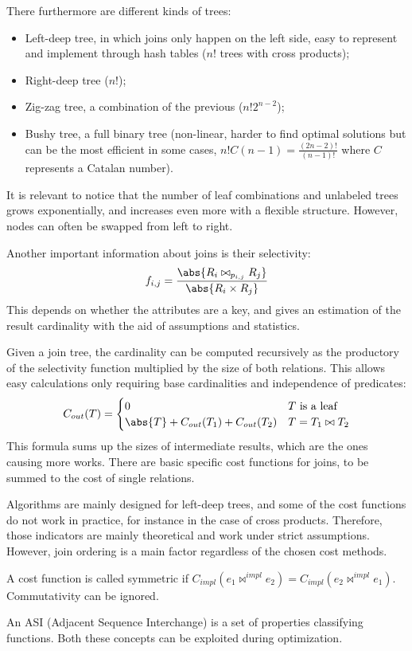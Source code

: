 There furthermore are different kinds of trees:
\begin{itemize}
	\item Left-deep tree, in which joins only happen on the left side, easy to represent and implement through hash tables ($n!$ trees with cross products);
	\item Right-deep tree ($n!$);
	\item Zig-zag tree, a combination of the previous ($n!2^{n-2}$);
	\item Bushy tree, a full binary tree (non-linear, harder to find optimal solutions but can be the most efficient in some cases, $n!C(n-1) = \frac{(2n-2)!}{(n-1)!}$ where $C$ represents a Catalan number).
\end{itemize}
It is relevant to notice that the number of leaf combinations and unlabeled trees grows exponentially, and increases even more with a flexible structure. However, nodes can often be swapped from left to right.

Another important information about joins is their selectivity: 
$$f_{i, j} = \frac{\abs{R_i \bowtie_{p_{i, j}} R_j}}{\abs{R_i \times R_j}}$$
This depends on whether the attributes are a key, and gives an estimation of the result cardinality with the aid of assumptions and statistics.

Given a join tree, the cardinality can be computed recursively as the productory of the selectivity function multiplied by the size of both relations. This allows easy calculations only requiring base cardinalities and independence of predicates:
$$C_{out}(T) = \begin{cases}
0 & T\text{ is a leaf} \\
\abs{T} + C_{out}(T_1) + C_{out}(T_2) & T = T_1 \bowtie T_2
\end{cases}$$
This formula sums up the sizes of intermediate results, which are the ones causing more works. There are basic specific cost functions for joins, to be summed to the cost of single relations. 

Algorithms are mainly designed for left-deep trees, and some of the cost functions do not work in practice, for instance in the case of cross products. Therefore, those indicators are mainly theoretical and work under strict assumptions. However, join ordering is a main factor regardless of the chosen cost methods.

A cost function is called symmetric if $C_{impl}(e_1 \bowtie^{impl} e_2) = C_{impl}(e_2 \bowtie^{impl} e_1)$. Commutativity can be ignored.

An ASI (Adjacent Sequence Interchange) is a set of properties classifying functions. Both these concepts can be exploited during optimization.


